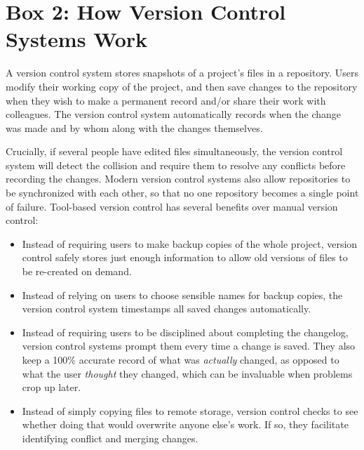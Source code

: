 \documentclass[10pt,letterpaper]{article}
\begin{document}
\pagebreak

\section*{Box 2: How Version Control Systems Work}

A version control system stores snapshots of a project's files in a
repository. Users modify their working copy of the project, and then
save changes to the repository when they wish to make
a permanent record and/or share their work with colleagues. The
version control system automatically records when the change was
made and by whom along with the changes themselves.

Crucially, if several people have edited files simultaneously, the
version control system will detect the collision and require them to
resolve any conflicts before recording the changes. Modern version
control systems also allow repositories to be synchronized with each
other, so that no one repository becomes a single point of failure.
Tool-based version control has several benefits over manual version
control:

\begin{itemize}

\item
  Instead of requiring users to make backup copies of the whole project,
  version control safely stores just enough information to allow old
  versions of files to be re-created on demand.

\item
  Instead of relying on users to choose sensible names for backup
  copies, the version control system timestamps all saved changes
  automatically.

\item
  Instead of requiring users to be disciplined about completing the
  changelog, version control systems prompt them every time a change
  is saved. They also keep a 100\% accurate record of what was
  \emph{actually} changed, as opposed to what the user
  \emph{thought} they changed, which can be invaluable when problems
  crop up later.

\item
  Instead of simply copying files to remote storage, version control
  checks to see whether doing that would overwrite anyone else's
  work. If so, they facilitate identifying conflict and merging changes.

\end{itemize}

\pagebreak
\end{document}
